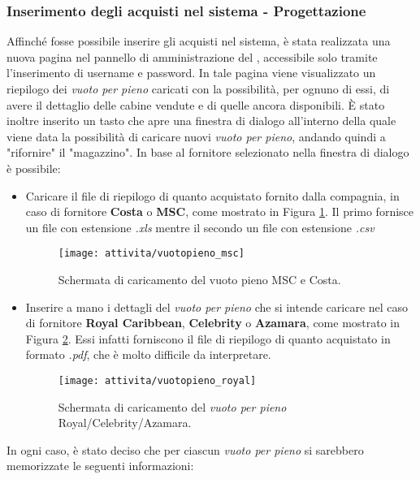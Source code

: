 \subsubsection{Inserimento degli acquisti nel sistema - Progettazione}
Affinché fosse possibile inserire gli acquisti nel sistema, è stata realizzata una nuova pagina nel pannello di amministrazione del \bookingEngine, accessibile solo tramite l'inserimento di username e password. In tale pagina viene visualizzato un riepilogo dei \textit{vuoto per pieno} caricati con la possibilità, per ognuno di essi, di avere il dettaglio delle cabine vendute e di quelle ancora disponibili. È stato inoltre inserito un tasto che apre una finestra di dialogo all'interno della quale viene data la possibilità di caricare nuovi \textit{vuoto per pieno}, andando quindi a "rifornire" il "magazzino". In base al fornitore selezionato nella finestra di dialogo è possibile: 
\begin{itemize}
	\item Caricare il file di riepilogo di quanto acquistato fornito dalla compagnia, in caso di fornitore \textbf{Costa} o \textbf{MSC}, come mostrato in Figura \ref{figura:upload-msc-costa}. Il primo fornisce un file con estensione \textit{.xls} mentre il secondo un file con estensione \textit{.csv}
	\begin{figure}[!h] 
		\centering 
		\texttt{[image: attivita/vuotopieno\_msc]} 
		\caption{Schermata di caricamento del vuoto pieno MSC e Costa.}
		\label{figura:upload-msc-costa}
	\end{figure}
	\item Inserire a mano i dettagli del \textit{vuoto per pieno} che si intende caricare nel caso di fornitore \textbf{Royal Caribbean}, \textbf{Celebrity} o \textbf{Azamara}, come mostrato in Figura \ref{figura:upload-royal}. Essi infatti forniscono il file di riepilogo di quanto acquistato in formato \textit{.pdf}, che è molto difficile da interpretare.
	\begin{figure}[!h] 
		\centering 
		\texttt{[image: attivita/vuotopieno\_royal]} 
		\caption{Schermata di caricamento del \textit{vuoto per pieno} Royal/Celebrity/Azamara.}
		\label{figura:upload-royal}
	\end{figure}
\end{itemize}
In ogni caso, è stato deciso che per ciascun \textit{vuoto per pieno} si sarebbero memorizzate le seguenti informazioni:
